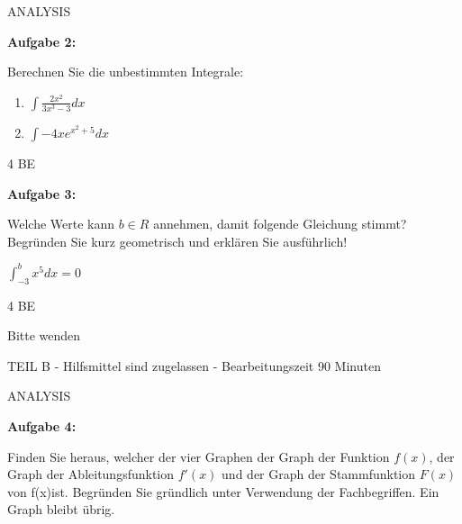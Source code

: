 \documentclass[a4paper,12pt]{article}
\newcommand{\Aufgabe}[1]{
  {
  \vspace*{0.5cm}
  \textsf{\textbf{Aufgabe #1}}
  \vspace*{0.2cm}
  
  }
}
\begin{document}
\vspace {0,5cm}
ANALYSIS

\Aufgabe{2:} 
Berechnen Sie die unbestimmten Integrale:

\begin{enumerate}[label={\alph*)}]
  \item $ \int \frac{2x^2}{3x^3-3} dx $
  \item $ \int -4xe^{x^2+5} dx $
\end{enumerate}
\begin{flushright}4 BE \end{flushright}
\Aufgabe{3:}
Welche Werte kann $ b \in R$ annehmen, damit folgende Gleichung stimmt? Begründen Sie kurz geometrisch und erklären Sie ausführlich!

 $ \int_ {-3}^{b} x^5 dx =0$
\begin{flushright}4 BE \end{flushright}
\begin{flushright}Bitte wenden \end{flushright}
\newpage

\vspace{0,5cm} {TEIL B} -  Hilfsmittel sind zugelassen - Bearbeitungszeit 90 Minuten


\vspace {0,5cm}
ANALYSIS

\Aufgabe{4:}

Finden Sie heraus, welcher der vier Graphen der Graph der Funktion $f(x)$, der Graph der Ableitungsfunktion  $f'(x)$ und der Graph der Stammfunktion  $F(x)$ von f(x)ist. Begründen Sie gründlich unter Verwendung der Fachbegriffen. Ein Graph bleibt übrig.
\end{document}
